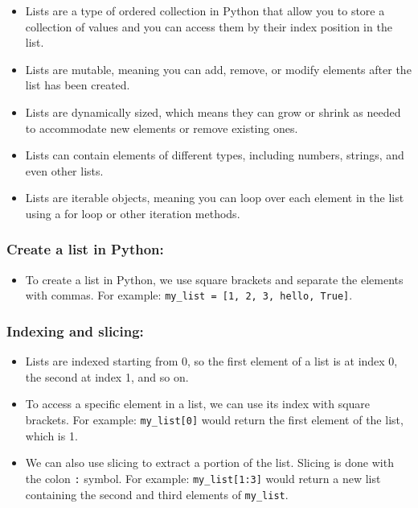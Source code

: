 \documentclass[11pt]{article}
\providecommand{\tightlist}{%
      \setlength{\itemsep}{0pt}\setlength{\parskip}{0pt}}
\begin{document}
\begin{itemize}
\item
  Lists are a type of ordered collection in Python that allow you to
  store a collection of values and you can access them by their index
  position in the list.
\item
  Lists are mutable, meaning you can add, remove, or modify elements
  after the list has been created.
\item
  Lists are dynamically sized, which means they can grow or shrink as
  needed to accommodate new elements or remove existing ones.
\item
  Lists can contain elements of different types, including numbers,
  strings, and even other lists.
\item
  Lists are iterable objects, meaning you can loop over each element in
  the list using a for loop or other iteration methods.
\end{itemize}

\hypertarget{create-a-list-in-python}{%
\subsubsection{Create a list in Python:}\label{create-a-list-in-python}}

\begin{itemize}
\tightlist
\item
  To create a list in Python, we use square brackets and separate the
  elements with commas. For example:
  \texttt{my\_list\ =\ {[}1,\ 2,\ 3,\ \textquotesingle{}hello\textquotesingle{},\ True{]}}.
\end{itemize}

\hypertarget{indexing-and-slicing}{%
\subsubsection{Indexing and slicing:}\label{indexing-and-slicing}}

\begin{itemize}
\item
  Lists are indexed starting from 0, so the first element of a list is
  at index 0, the second at index 1, and so on.
\item
  To access a specific element in a list, we can use its index with
  square brackets. For example: \texttt{my\_list{[}0{]}} would return
  the first element of the list, which is 1.
\item
  We can also use slicing to extract a portion of the list. Slicing is
  done with the colon \texttt{:} symbol. For example:
  \texttt{my\_list{[}1:3{]}} would return a new list containing the
  second and third elements of \texttt{my\_list}.
\end{itemize}
\end{document}

